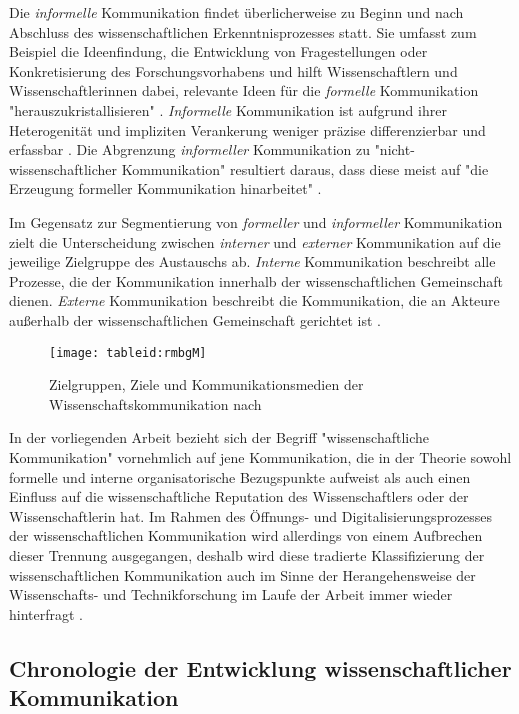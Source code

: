 Die \textit{informelle} Kommunikation findet überlicherweise zu Beginn und nach Abschluss des wissenschaftlichen Erkenntnisprozesses statt. Sie umfasst zum Beispiel die Ideenfindung, die Entwicklung von Fragestellungen oder Konkretisierung des Forschungsvorhabens und hilft Wissenschaftlern und Wissenschaftlerinnen dabei, relevante Ideen für die \textit{formelle} Kommunikation "herauszukristallisieren" \cite{Hanekop_2014}. \textit{Informelle} Kommunikation ist aufgrund ihrer Heterogenität und impliziten Verankerung weniger präzise differenzierbar und erfassbar \cite{kaden_2009_library}. Die Abgrenzung \textit{informeller} Kommunikation zu "nicht-wissenschaftlicher Kommunikation" resultiert daraus, dass diese meist auf "die Erzeugung formeller Kommunikation hinarbeitet" \cite{kaden_2009_library}.

Im Gegensatz zur Segmentierung von \textit{formeller} und \textit{informeller} Kommunikation zielt die Unterscheidung zwischen \textit{interner} und \textit{externer} Kommunikation auf die jeweilige Zielgruppe des Austauschs ab. \textit{Interne} Kommunikation beschreibt alle Prozesse, die der Kommunikation innerhalb der wissenschaftlichen Gemeinschaft dienen. \textit{Externe} Kommunikation beschreibt die Kommunikation, die an Akteure außerhalb der wissenschaftlichen Gemeinschaft gerichtet ist \cite{Konneker_2013}.

\begin{figure}[h!]
\texttt{[image: tableid:rmbgM]}
\caption{Zielgruppen, Ziele und Kommunikationsmedien der Wissenschaftskommunikation nach  \cite{seidenfaden_2005_kommunikation}}
\end{figure}

In der vorliegenden Arbeit bezieht sich der Begriff "wissenschaftliche Kommunikation" vornehmlich auf jene Kommunikation, die in der Theorie sowohl formelle und interne organisatorische Bezugspunkte aufweist als auch einen Einfluss auf die wissenschaftliche Reputation des Wissenschaftlers oder der Wissenschaftlerin hat. Im Rahmen des Öffnungs- und Digitalisierungsprozesses der wissenschaftlichen Kommunikation wird allerdings von einem Aufbrechen dieser Trennung ausgegangen, deshalb wird diese tradierte Klassifizierung der wissenschaftlichen Kommunikation auch im Sinne der Herangehensweise der Wissenschafts- und Technikforschung im Laufe der Arbeit immer wieder hinterfragt  \cite[:326]{bowker_2000_sorting}.

\subsection{Chronologie der Entwicklung wissenschaftlicher Kommunikation}

